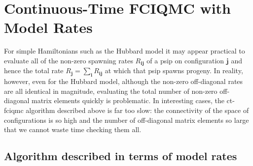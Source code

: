 \documentclass[a4paper, 11pt]{article}
\newcommand{\bi}{\mathbf{i}}
\newcommand{\bj}{\mathbf{j}}
\begin{document}
\section*{Continuous-Time FCIQMC with Model Rates}

For simple Hamiltonians such as the Hubbard model it may appear
practical to evaluate all of the non-zero spawning rates $R_{\bi\bj}$ of
a psip on configuration $\bj$ and hence the total rate $R_{\bj} =
\sum_{\bi} R_{\bi\bj}$ at which that psip spawns progeny. In reality,
however, even for the Hubbard model, although the non-zero off-diagonal
rates are all identical in magnitude, evaluating the total number of
non-zero off-diagonal matrix elements quickly is problematic.  In
interesting cases, the ct-fciqmc algorithm described above is far too
slow: the connectivity of the space of configurations is so high and the
number of off-diagonal matrix elements so large that we cannot waste
time checking them all.

\subsection*{Algorithm described in terms of model rates}
\end{document}
